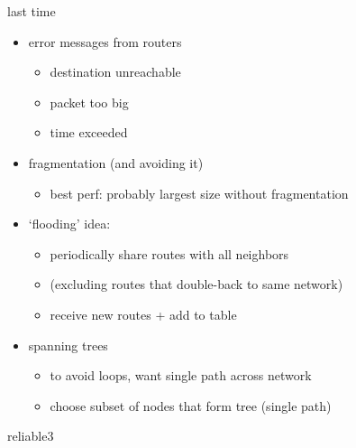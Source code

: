 \date{}
\title{}
\date{}

\begin{frame}
    \titlepage
\end{frame}

\begin{frame}{last time}
    \begin{itemize}
    \item error messages from routers
        \begin{itemize}
        \item destination unreachable
        \item packet too big
        \item time exceeded
        \end{itemize}
    \item fragmentation (and avoiding it)
        \begin{itemize}
        \item best perf: probably largest size without fragmentation
        \end{itemize}
    \item `flooding' idea:
        \begin{itemize}
        \item periodically share routes with all neighbors
        \item (excluding routes that double-back to same network)
        \item receive new routes + add to table
        \end{itemize}
    \item spanning trees
        \begin{itemize}
        \item to avoid loops, want single path across network
        \item choose subset of nodes that form tree (single path)
        \end{itemize}
    \end{itemize}
\end{frame}

\begin{frame}{reliable3}
\end{frame}

